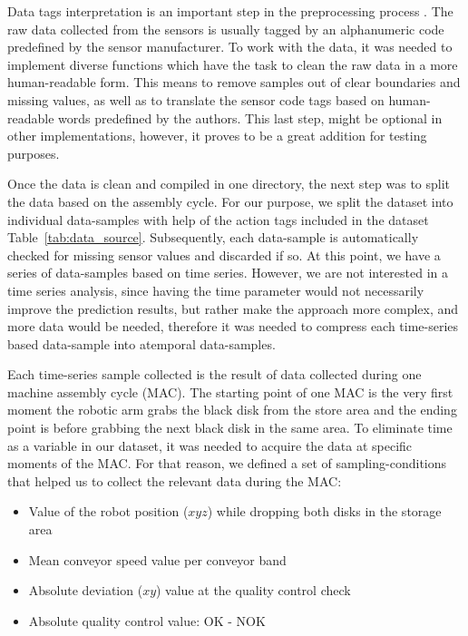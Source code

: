 \documentclass[5p,times,procedia]{elsarticle}
\begin{document}
Data tags interpretation is an important step in the preprocessing process \cite{goodfellow2016deep}. The raw data collected from the sensors is usually tagged by an alphanumeric code predefined by the sensor manufacturer. To work with the data, it was needed to implement diverse functions which have the task to clean the raw data in a more human-readable form. This means to remove samples out of clear boundaries and missing values, as well as to translate the sensor code tags based on human-readable words predefined by the authors. This last step, might be optional in other implementations, however, it proves to be a great addition for testing purposes.

Once the data is clean and compiled in one directory, the next step was to split the data based on the assembly cycle. For our purpose, we split the dataset into individual data-samples with help of the action tags included in the dataset Table~\ref{tab:data_source}. Subsequently, each data-sample is automatically checked for missing sensor values and discarded if so. At this point, we have a series of data-samples based on time series. However, we are not interested in a time series analysis, since having the time parameter would not necessarily improve the prediction results, but rather make the approach more complex, and more data would be needed, therefore it was needed to compress each time-series based data-sample into atemporal data-samples.

Each time-series sample collected is the result of data collected during one machine assembly cycle (MAC). The starting point of one MAC is the very first moment the robotic arm grabs the black disk from the store area and the ending point is before grabbing the next black disk in the same area.
To eliminate time as a variable in our dataset, it was needed to acquire the data at specific moments of the MAC. For that reason, we defined a set of sampling-conditions that helped us to collect the relevant data during the MAC:
\begin{itemize}
       \item Value of the robot position ($xyz$) while dropping both disks in the storage area
       \item Mean conveyor speed value per conveyor band
       \item Absolute deviation ($xy$) value at the quality control check
       \item Absolute quality control value: OK - NOK
\end{itemize}
\end{document}
